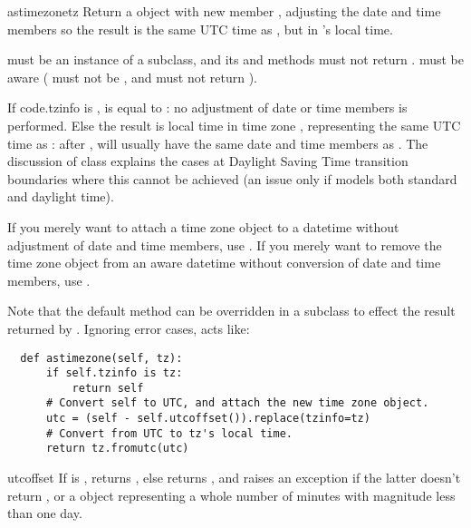 \begin{methoddesc}{astimezone}{tz}
  Return a  object with new  member
  , adjusting the date and time members so the result is the
  same UTC time as , but in 's local time.

   must be an instance of a  subclass, and its
   and  methods must not return
  .   must be aware ( must
  not be , and  must not return
  ).

  If code{.tzinfo} is ,
   is equal to :  no
  adjustment of date or time members is performed.
  Else the result is local time in time zone , representing the
  same UTC time as :  after ,
   will usually have the same
  date and time members as .
  The discussion of class  explains the cases at Daylight
  Saving Time transition boundaries where this cannot be achieved (an issue
  only if  models both standard and daylight time).

  If you merely want to attach a time zone object  to a
  datetime  without adjustment of date and time members,
  use .  If
  you merely want to remove the time zone object from an aware datetime
   without conversion of date and time members, use
  .

  Note that the default  method can be overridden
  in a  subclass to effect the result returned by
  .  Ignoring error cases, 
  acts like:

  \begin{verbatim}
  def astimezone(self, tz):
      if self.tzinfo is tz:
          return self
      # Convert self to UTC, and attach the new time zone object.
      utc = (self - self.utcoffset()).replace(tzinfo=tz)
      # Convert from UTC to tz's local time.
      return tz.fromutc(utc)
  \end{verbatim}
\end{methoddesc}

\begin{methoddesc}{utcoffset}{}
  If  is , returns , else
  returns , and
  raises an exception if the latter doesn't return , or
  a  object representing a whole number of minutes
  with magnitude less than one day.
\end{methoddesc}

